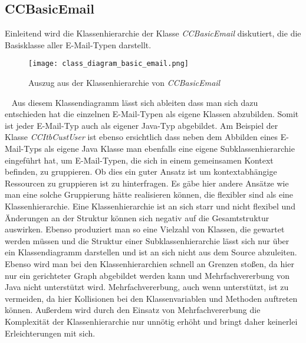 \subsection{CCBasicEmail}
\label{sec:implementierung-ccbasic-mail}
Einleitend wird die Klassenhierarchie der Klasse \emph{CCBasicEmail} diskutiert, die die Basisklasse aller E-Mail-Typen darstellt.
\begin{figure}[h]
\centering
\texttt{[image: class\_diagram\_basic\_email.png]} 
\caption{Auszug aus der Klassenhierarchie von \emph{CCBasicEmail}}
\label{fig:klassen-hierarchie-ccbasicemail}
\end{figure}
\ \newline
Aus diesem Klassendiagramm lässt sich ableiten dass man sich dazu entschieden hat die einzelnen E-Mail-Typen als eigene Klassen abzubilden. Somit ist jeder E-Mail-Typ auch als eigener Java-Typ abgebildet. Am Beispiel der Klasse \emph{CCItbCustUser} ist ebenso ersichtlich dass neben dem Abbilden eines E-Mail-Typs als eigene Java Klasse man ebenfalls eine eigene Subklassenhierarchie eingeführt hat, um E-Mail-Typen, die sich in einem gemeinsamen Kontext befinden, zu gruppieren. Ob dies ein guter Ansatz ist um kontextabhängige Ressourcen zu gruppieren ist zu hinterfragen. Es gäbe hier andere Ansätze wie man eine solche Gruppierung hätte realisieren können, die flexibler sind als eine Klassenhierarchie. Eine Klassenhierarchie ist an sich starr und nicht flexibel und Änderungen an der Struktur können sich negativ auf die Gesamtstruktur auswirken. Ebenso produziert man so eine Vielzahl von Klassen, die gewartet werden müssen und die Struktur einer Subklassenhierarchie lässt sich nur über ein Klassendiagramm darstellen und ist an sich nicht aus dem Source abzuleiten. Ebenso wird man bei den Klassenhierarchien schnell an Grenzen stoßen, da hier nur ein gerichteter Graph abgebildet werden kann und Mehrfachvererbung von Java nicht unterstützt wird. Mehrfachvererbung, auch wenn unterstützt, ist zu vermeiden, da hier Kollisionen bei den Klassenvariablen und Methoden auftreten können. Außerdem wird durch den Einsatz von Mehrfachvererbung die Komplexität der Klassenhierarchie nur unnötig erhöht und bringt daher keinerlei Erleichterungen mit sich.

